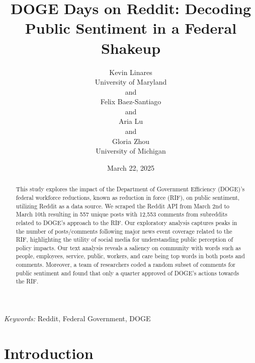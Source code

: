 \documentclass[
  12pt]{article}
\begin{document}
\def\spacingset#1{\renewcommand{\baselinestretch}%
{#1}\small\normalsize} \spacingset{1}



\date{March 22, 2025}
\title{\bf DOGE Days on Reddit: Decoding Public Sentiment in a Federal
Shakeup}
\author{
Kevin Linares\\
University of Maryland\\
and\\Felix Baez-Santiago\\
and\\Aria Lu\\
and\\Gloria Zhou\\
University of Michigan\\
}
\maketitle

\bigskip
\bigskip
\begin{abstract}
This study explores the impact of the Department of Government
Efficiency (DOGE)'s federal workforce reductions, known as reduction in
force (RIF), on public sentiment, utilizing Reddit as a data source. We
scraped the Reddit API from March 2nd to March 10th resulting in 557
unique posts with 12,553 comments from subreddits related to DOGE's
approach to the RIF. Our exploratory analysis captures peaks in the
number of posts/comments following major news event coverage related to
the RIF, highlighting the utility of social media for understanding
public perception of policy impacts. Our text analysis reveals a
saliency on community with words such as people, employees, service,
public, workers, and care being top words in both posts and comments.
Moreover, a team of researchers coded a random subset of comments for
public sentiment and found that only a quarter approved of DOGE's
actions towards the RIF.
\end{abstract}

\noindent%
{\it Keywords:} Reddit, Federal Government, DOGE
\vfill

\newpage
\spacingset{1.9} %


\section{Introduction}\label{sec-intro}
\end{document}
